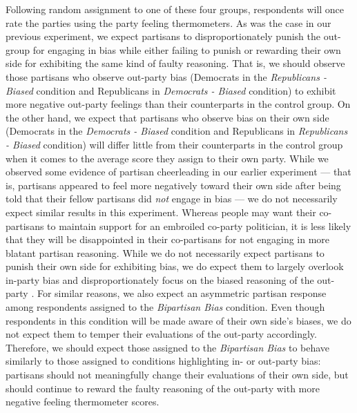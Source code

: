 \documentclass[12pt, letterpaper]{article}
\begin{document}
Following random assignment to one of these four groups, respondents will once rate the parties using the party feeling thermometers. As was the case in our previous experiment, we expect partisans to disproportionately punish the out-group for engaging in bias while either failing to punish or rewarding their own side for exhibiting the same kind of faulty reasoning. That is, we should observe those partisans who observe out-party bias (Democrats in the \textit{Republicans - Biased} condition and Republicans in \textit{Democrats - Biased} condition) to exhibit more negative out-party feelings than their counterparts in the control group. On the other hand, we expect that partisans who observe bias on their own side (Democrats in the \textit{Democrats - Biased} condition and Republicans in \textit{Republicans - Biased} condition) will differ little from their counterparts in the control group when it comes to the average score they assign to their own party. While we observed some evidence of partisan cheerleading in our earlier experiment --- that is, partisans appeared to feel more negatively toward their own side after being told that their fellow partisans did \textit{not} engage in bias --- we do not necessarily expect similar results in this experiment. Whereas people may want their co-partisans to maintain support for an embroiled co-party politician, it is less likely that they will be disappointed in their co-partisans for not engaging in more blatant partisan reasoning. While we do not necessarily expect partisans to punish their own side for exhibiting bias, we do expect them to largely overlook in-party bias and disproportionately focus on the biased reasoning of the out-party \citep{proninetal_2002,pronin_2007}. For similar reasons, we also expect an asymmetric partisan response among respondents assigned to the \textit{Bipartisan Bias} condition. Even though respondents in this condition will be made aware of their own side's biases, we do not expect them to temper their evaluations of the out-party accordingly. Therefore, we should expect those assigned to the \textit{Bipartisan Bias} to behave similarly to those assigned to conditions highlighting in- or out-party bias: partisans should not meaningfully change their evaluations of their own side, but should continue to reward the faulty reasoning of the out-party with more negative feeling thermometer scores. 
\end{document}

